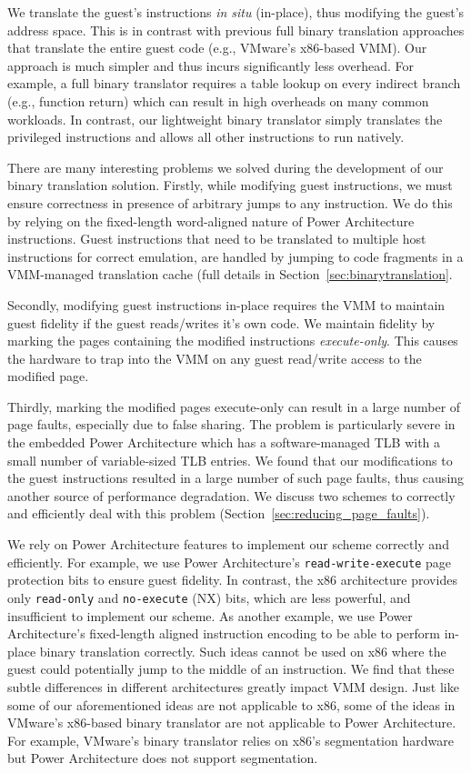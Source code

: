 \documentclass[10pt,twocolumn]{article}
\begin{document}
We translate the guest's instructions {\em in situ} (in-place), thus modifying the guest's
address space. This is in contrast with previous full binary translation approaches
that translate the entire guest
code (e.g., VMware's x86-based VMM\cite{agesen:comparison}). Our approach is much
simpler and thus incurs significantly less overhead. For example, a full binary
translator requires a table lookup on every indirect branch (e.g., function return) which
can result in high overheads on many common workloads. In contrast, our lightweight
binary translator simply translates the privileged instructions and allows all other
instructions to run natively.

There are many interesting problems we solved during the development of our
binary translation solution. 
Firstly, while modifying guest instructions, we must ensure correctness in presence
of arbitrary jumps to any instruction. We do this by relying on the fixed-length
word-aligned nature of Power Architecture instructions. Guest instructions
that need to be translated to multiple host instructions for correct emulation, are
handled by jumping to code fragments in a VMM-managed translation cache (full
details in Section~\ref{sec:binarytranslation}.

Secondly, modifying guest instructions in-place requires the VMM to maintain guest
fidelity if the guest reads/writes it's own code. We maintain fidelity by 
marking the pages containing the modified instructions {\em execute-only}. This
causes the hardware to trap into the VMM on any guest read/write access to the
modified page.

Thirdly, marking the modified pages execute-only can result in a large number of
page faults, especially due to false sharing. The problem is particularly
severe in the embedded Power Architecture which has a software-managed TLB with
a small number of variable-sized TLB entries. We found that our modifications to
the guest instructions resulted in a large number of such page faults, thus causing
another source of performance degradation. We discuss two schemes to correctly
and efficiently deal with this problem (Section~\ref{sec:reducing_page_faults}).

We rely on Power Architecture features to implement our
scheme correctly and efficiently. For example, we use
Power Architecture's {\tt read-write-execute} page protection bits to ensure guest
fidelity. In contrast, the x86 architecture provides only {\tt read-only} and
{\tt no-execute} (NX) bits, which are less powerful, and insufficient
to implement our scheme. As another
example, we use Power
Architecture's fixed-length aligned instruction encoding to be able to
perform in-place binary translation correctly. Such ideas cannot be used
on x86 where the guest could potentially jump to the middle of an instruction.
We find that these subtle
differences in different architectures greatly impact VMM design. Just like some
of our aforementioned ideas are not applicable to
x86, some of the ideas in VMware's x86-based binary translator
are not applicable to Power Architecture. For example, VMware's binary translator
relies on x86's segmentation hardware but Power Architecture does not
support segmentation.
\end{document}
